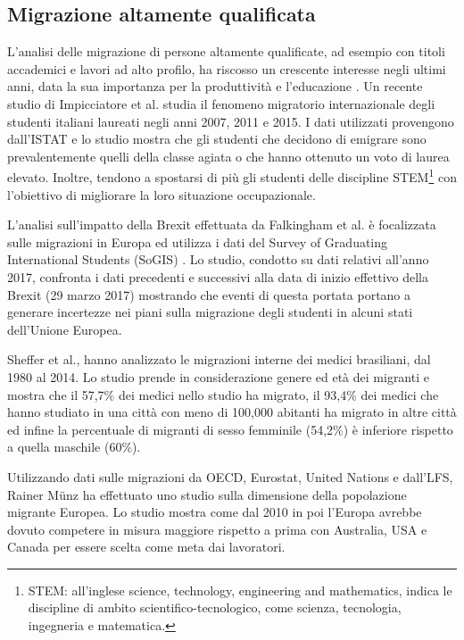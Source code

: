 \subsection{Migrazione altamente qualificata}

L'analisi delle migrazione di persone altamente qualificate, ad esempio con titoli accademici e lavori ad alto profilo, ha riscosso un crescente interesse negli ultimi anni, data la sua importanza per la produttività e l'educazione \cite{sirbu2021human}. 
Un recente studio di Impicciatore et al. \cite{impicciatore2021emigrazione} studia il fenomeno migratorio internazionale degli studenti italiani laureati negli anni 2007, 2011 e 2015. I dati utilizzati provengono dall'ISTAT e lo studio mostra che gli studenti che decidono di emigrare sono prevalentemente quelli della classe agiata o che hanno ottenuto un voto di laurea elevato. Inoltre, tendono a spostarsi di più gli studenti delle discipline STEM\footnote{STEM: all'inglese science, technology, engineering and mathematics, indica le discipline di ambito  scientifico-tecnologico, come scienza, tecnologia, ingegneria e matematica.} con l'obiettivo di migliorare la loro situazione occupazionale. 

L'analisi sull'impatto della Brexit effettuata da Falkingham et al. \cite{doi.org/10.1111/manc.12356} è focalizzata sulle migrazioni in Europa ed utilizza i dati del Survey of Graduating International Students (SoGIS) \cite{falkingham_wahba_giulietti_chuhong}. Lo studio, condotto su dati relativi all'anno 2017, confronta i dati precedenti e successivi alla data di inizio effettivo della Brexit (29 marzo 2017) mostrando che eventi di questa portata portano a generare incertezze nei piani sulla migrazione degli studenti in alcuni stati dell'Unione Europea. 

Sheffer et al., \cite{Scheffer2018} hanno analizzato le migrazioni interne dei medici brasiliani, dal 1980 al 2014. Lo studio prende in considerazione genere ed età dei migranti e mostra che il 57,7\% dei medici nello studio ha migrato, il 93,4\% dei medici che hanno studiato in una città con meno di 100,000 abitanti ha migrato in altre città ed infine la percentuale di migranti di sesso femminile (54,2\%) è inferiore rispetto a quella maschile (60\%). 

Utilizzando dati sulle migrazioni da OECD, Eurostat, United Nations e dall'LFS, Rainer M\"{u}nz \cite{Munz2007Migration} ha effettuato uno studio sulla dimensione della popolazione migrante Europea. Lo studio mostra come dal 2010 in poi l'Europa avrebbe dovuto competere in misura maggiore rispetto a prima con Australia, USA e Canada per essere scelta come meta dai lavoratori. 

